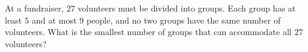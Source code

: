 At a fundraiser, $27$ volunteers must be divided into groups. Each group has at least $5$ and at most $9$ people, and no two groups have the same number of volunteers. What is the smallest number of groups that can accommodate all $27$ volunteers?
